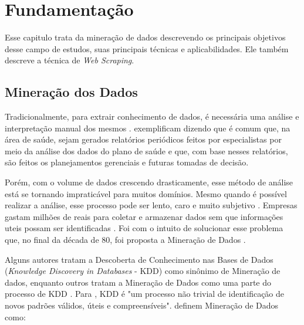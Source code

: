 \chapter{Fundamentação}\label{chp:LABEL_CHP_2}

Esse capitulo trata da mineração de dados descrevendo os principais objetivos desse campo de estudos, suas principais técnicas e aplicabilidades. Ele também descreve a técnica de \textit{Web Scraping}.

\section{Mineração dos Dados}


Tradicionalmente, para extrair conhecimento de dados, é necessária uma análise e interpretação manual dos mesmos \cite{fayyad1996data}.  exemplificam dizendo que é comum que, na área de saúde, sejam gerados relatórios periódicos feitos por especialistas por meio da análise dos dados do plano de saúde e que, com base nesses relatórios, são feitos os planejamentos gerenciais e futuras tomadas de decisão.

Porém, com o volume de dados crescendo drasticamente, esse método de análise está se tornando impraticável para muitos domínios. Mesmo quando é possível realizar a análise, esse processo pode ser lento, caro e muito subjetivo \cite{fayyad1996data}. Empresas gastam milhões de reais para coletar e armazenar dados sem que informações uteis possam ser identificadas \cite{camilo2009mineraccao}. Foi com o intuito de solucionar esse problema que, no final da década de 80, foi proposta a Mineração de Dados \cite{camilo2009mineraccao}.

Alguns autores tratam a Descoberta de Conhecimento nas Bases de Dados (\textit{Knowledge Discovery in Databases} - KDD) como sinônimo de Mineração de dados, enquanto outros tratam a Mineração de Dados como uma parte do processo de KDD \cite{camilo2009mineraccao}. Para , KDD é "um processo não trivial de identificação de novos padrões válidos, úteis e compreensíveis".  definem Mineração de Dados como:


